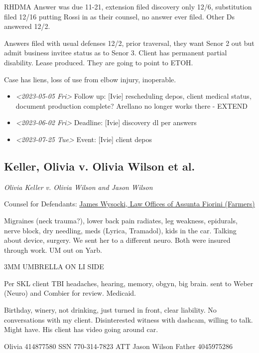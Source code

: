 \documentclass[11pt]{article}
\begin{document}
RHDMA Answer was due 11-21, extension filed discovery only 12/6, substitution filed 12/16 putting Rossi in as their counsel, no answer ever filed. Other Ds answered 12/2.

Answers filed with usual defenses 12/2, prior traversal, they want Senor 2 out but admit business invitee status as to Senor 3. Client has permanent partial disability. Lease produced. They are going to point to ETOH.

Case has liens, loss of use from elbow injury, inoperable.

\begin{itemize}
\item \textit{<2023-05-05 Fri> } Follow up: [Ivie] rescheduling depos, client medical status, document production complete? Arellano no longer works there - EXTEND

\item \textit{<2023-06-02 Fri> } Deadline: [Ivie] discovery dl per answers

\item \textit{<2023-07-25 Tue> } Event: [Ivie] client depos
\end{itemize}

\subsection*{Keller, Olivia v. Olivia Wilson et al.}
\label{sec:org6eabd50}

\emph{Olivia Keller v. Olivia Wilson and Jason Wilson}

Counsel for Defendants: \href{https://gabar.org/MemberSearchDetail.cfm?ID=NTg2NDU2}{James Wysocki, Law Offices of Assunta Fiorini (Farmers)}

Migraines (neck trauma?), lower back pain radiates, leg weakness, epidurals, nerve block, dry needling, meds (Lyrica, Tramadol), kids in the car. Talking about device, surgery. We sent her to a different neuro. Both were insured through work. UM out on Yarb.

3MM UMBRELLA ON LI SIDE

Per SKL client TBI headaches, hearing, memory, obgyn, big brain. sent to Weber (Neuro) and Combier for review. Medicaid.

Birthday, winery, not drinking, just turned in front, clear liability. No conversations with my client. Disinterested witness with dashcam, willing to talk. Might have. His client has video going around car.

Olivia 414877580 SSN
770-314-7823 ATT Jason Wilson
Father 4045975286
\end{document}
